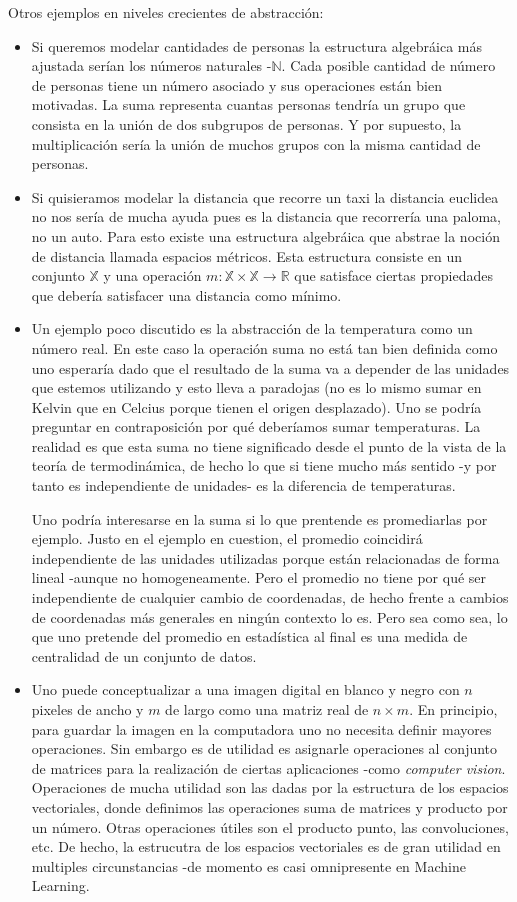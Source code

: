 Otros ejemplos en niveles crecientes de abstracción:
\begin{itemize}
    \item Si queremos modelar cantidades de personas la estructura algebráica más ajustada serían los números naturales -$\mathbb{N}$. Cada posible cantidad de número de personas tiene un número asociado y sus operaciones están bien motivadas. La suma representa cuantas personas tendría un grupo que consista en la unión de dos subgrupos de personas. Y por supuesto, la multiplicación sería la unión de muchos grupos con la misma cantidad de personas.
    \item Si quisieramos modelar la distancia que recorre un taxi la distancia euclidea no nos sería de mucha ayuda pues es la distancia que recorrería una paloma, no un auto. Para esto existe una estructura algebráica que abstrae la noción de distancia llamada espacios métricos. Esta estructura consiste en un conjunto $\mathbb{X}$ y una operación $m:\mathbb{X}\times \mathbb{X}\to \mathbb{R}$ que satisface ciertas propiedades que debería satisfacer una distancia como mínimo.
    \item Un ejemplo poco discutido es la abstracción de la temperatura como un número real. En este caso la operación suma no está tan bien definida como uno esperaría dado que el resultado de la suma va a depender de las unidades que estemos utilizando y esto lleva a paradojas (no es lo mismo sumar en Kelvin que en Celcius porque tienen el origen desplazado). Uno se podría preguntar en contraposición por qué deberíamos sumar temperaturas. La realidad es que esta suma no tiene significado desde el punto de la vista de la teoría de termodinámica, de hecho lo que si tiene mucho más sentido -y por tanto es independiente de unidades- es la diferencia de temperaturas. 
    
    Uno podría interesarse en la suma si lo que prentende es promediarlas por ejemplo. Justo en el ejemplo en cuestion, el promedio coincidirá independiente de las unidades utilizadas porque están relacionadas de forma lineal -aunque no homogeneamente. Pero el promedio no tiene por qué ser independiente de cualquier cambio de coordenadas, de hecho frente a cambios de coordenadas más generales en ningún contexto lo es. Pero sea como sea, lo que uno pretende del promedio en estadística al final es una medida de centralidad de un conjunto de datos.
    \item Uno puede conceptualizar a una imagen digital en blanco y negro con $n$ pixeles de ancho y $m$ de largo como una matriz real de $n\times m$. En principio, para guardar la imagen en la computadora uno no necesita definir mayores operaciones. Sin embargo es de utilidad es asignarle operaciones al conjunto de matrices para la realización de ciertas aplicaciones -como {\it computer vision}. Operaciones de mucha utilidad son las dadas por la estructura de los espacios vectoriales, donde definimos las operaciones suma de matrices y producto por un número. Otras operaciones útiles son el producto punto, las convoluciones, etc. De hecho, la estrucutra de los espacios vectoriales es de gran utilidad en multiples circunstancias -de momento es casi omnipresente en Machine Learning.
\end{itemize}

